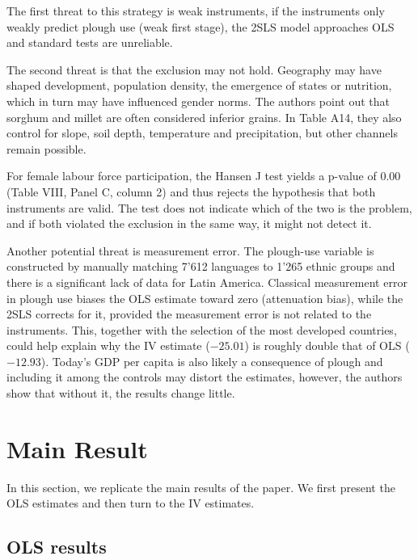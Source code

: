 \documentclass[12pt,a4paper]{article}
\begin{document}
The first threat to this strategy is weak instruments, if the instruments only weakly predict plough use (weak first stage), the 2SLS model approaches OLS and standard tests are unreliable.

The second threat is that the exclusion may not hold. Geography may have shaped development, population density, the emergence of states or nutrition, which in turn may have influenced gender norms. The authors point out that sorghum and millet are often considered inferior grains. In Table A14, they also control for slope, soil depth, temperature and precipitation, but other channels remain possible.

For female labour force participation, the Hansen J test yields a p-value of 0.00 (Table VIII, Panel C, column 2) and thus rejects the hypothesis that both instruments are valid. The test does not indicate which of the two is the problem, and if both violated the exclusion in the same way, it might not detect it.

Another potential threat is measurement error. The plough-use variable is constructed by manually matching 7'612 languages to 1'265 ethnic groups and there is a significant lack of data for Latin America. Classical measurement error in plough use biases the OLS estimate toward zero (attenuation bias), while the 2SLS corrects for it, provided the measurement error is not related to the instruments. This, together with the selection of the most developed countries, could help explain why the IV estimate ($-25.01$) is roughly double that of OLS ($-12.93$). Today's GDP per capita is also likely a consequence of plough and including it among the controls may distort the estimates, however, the authors show that without it, the results change little.

\section{Main Result}

In this section, we replicate the main results of the paper. We first present the OLS estimates and then turn to the IV estimates.

\subsection{OLS results}
\end{document}
